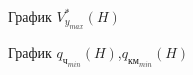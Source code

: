 \begin{figure}[H]
    \centering
    \resizebox{.79\linewidth}{!}{}
    \caption{График $V_{y_{max}}^*(H)$}
    \label{fig:H_v_celling}
\end{figure}

\begin{figure}[H]
    \centering
    \resizebox{.79\linewidth}{!}{}
    \caption{График $q_{ч_{min}}(H)$,$q_{км_{min}}(H)$}
    \label{fig:q_min_H}
\end{figure}

